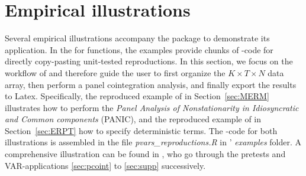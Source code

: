 
\section{Empirical illustrations} \label{sec:Illustration}
Several empirical illustrations accompany the package to demonstrate its application. 
In the  for functions, the examples provide chunks of -code for directly copy-pasting unit-tested reproductions. 
In this section, we focus on the workflow of  and therefore guide the user to first organize the $ K \times T \times N  $ data array, then perform a panel cointegration analysis, and finally export the results to Latex. Specifically, the reproduced example of \citet{ArsovaOersal2017} in Section~\ref{sec:MERM} illustrates how to perform the \textit{Panel Analysis of Nonstationarity in Idiosyncratic and Common components} (PANIC), and the reproduced example of \citet{ArsovaOersal2020} in Section~\ref{sec:ERPT} how to specify deterministic terms. The -code for both illustrations is assembled in the file \textit{pvars\_reproductions.R} in ' \textit{examples} folder. 
A comprehensive illustration can be found in \citet{EmptingHerwartz2021b}, who go through the pretests and VAR-applications \ref{sec:pcoint} to \ref{sec:supp} successively.



